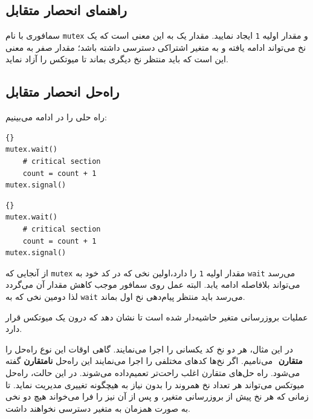 \documentclass{book}
\newcommand{\clearemptydoublepage}{\newpage\cleardoublepage}
\begin{document}
\clearemptydoublepage
\subsection{راهنمای انحصار متقابل}

    سمافوری با نام \texttt{mutex} و مقدار اولیه \texttt{1} ایجاد نمایید. 
    مقدار یک به این معنی است که یک نخ می‌تواند ادامه یافته و به متغیر اشتراکی دسترسی داشته باشد؛ مقدار صفر به معنی این است که 
    باید منتظر نخ دیگری بماند تا میوتکس را آزاد نماید. 


\clearemptydoublepage
\subsection{  راه‌حل انحصار متقابل}

    راه حلی را در ادامه می‌بینیم:

\begin{latin}
\begin{minipage}[t]{2in}
\begin{latin}
\begin{lstlisting}[title=\rl{نخ \lr{A}}]{}
mutex.wait()
    # critical section
    count = count + 1
mutex.signal()
\end{lstlisting}
\end{latin}
\end{minipage}
\hfill
\begin{minipage}[t]{2in}
\begin{latin}
\begin{lstlisting}[title=\rl{نخ \lr{B}}]{}
mutex.wait()
    # critical section
    count = count + 1
mutex.signal()
\end{lstlisting}
\end{latin}
\end{minipage}
\end{latin}

    از آنجایی که \texttt{mutex} مقدار اولیه  \texttt{1} را دارد،اولین نخی که در کد خود به \texttt{wait} می‌رسد می‌تواند بلافاصله ادامه یابد.
    البته عمل  روی سمافور موجب کاهش مقدار آن می‌گردد لذا دومین نخی که به  \texttt{wait} می‌رسد باید منتظر پیام‌دهی نخ اول بماند. 

    عملیات بروزرسانی متغیر حاشیه‌دار شده است تا نشان دهد که درون یک میوتکس  قرار دارد. 
    
    در این مثال، هر دو نخ کد یکسانی را اجرا می‌نمایند. گاهی اوقات این نوع راه‌حل را \textbf{متقارن} ‌
    می‌نامیم. اگر نخ‌ها کدهای مختلفی را اجرا می‌نمایند این راه‌حل \textbf{نامتقارن}
    گفته می‌شود. راه حل‌های متقارن اغلب راحت‌تر تعمیم‌داده می‌شوند. در این حالت، راه‌حل  میوتکس می‌تواند هر تعداد نخ همروند را بدون 
    نیاز به هیچگونه تغییری مدیریت نماید. تا زمانی که هر نخ پیش از بروزرسانی متغیر،    و پس از آن نیز    
    را فرا می‌خواند هیچ دو نخی به صورت همزمان به متغیر  دسترسی نخواهند داشت.
\end{document}

